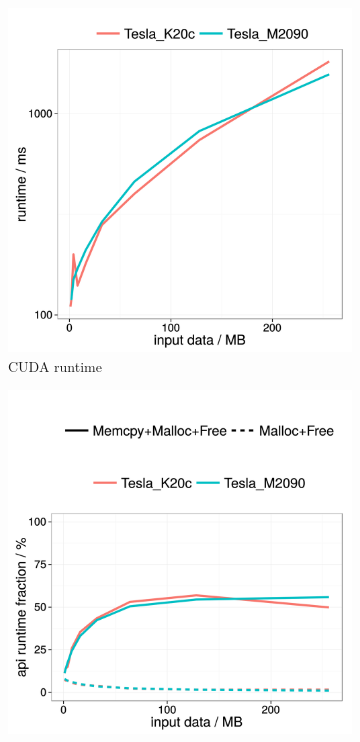 \begin{figure}[h]
  \centering
  \hfill
  \begin{subfigure}[b]{0.45\textwidth}
    \includegraphics[width=\textwidth]{plots/synced_gpu_runtime}
    \caption{CUDA runtime}
    \label{fig:single_fft_runtime}
  \end{subfigure}%
  \hfill
  \begin{subfigure}[b]{0.45\textwidth}
    \includegraphics[width=\textwidth]{plots/synced_gpu_api_fractioninplace}

\end{subfigure}
\end{figure}
